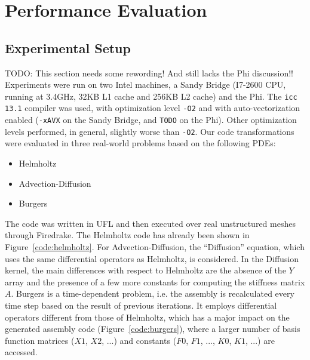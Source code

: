 \documentclass[conference]{IEEEtran}
\begin{document}
\section{Performance Evaluation}
\label{sec:perf-results}

\subsection{Experimental Setup}

TODO: This section needs some rewording! And still lacks the Phi discussion!! \\

Experiments were run on two Intel machines, a Sandy Bridge (I7-2600 CPU, running at 3.4GHz, 32KB L1 cache and 256KB L2 cache) and the Phi. The \texttt{icc 13.1} compiler was used, with optimization level \texttt{-O2} and with auto-vectorization enabled (\texttt{-xAVX} on the Sandy Bridge, and \texttt{TODO} on the Phi). Other optimization levels performed, in general, slightly worse than \texttt{-O2}. Our code transformations were evaluated in three real-world problems based on the following PDEs:
\begin{itemize}
\item Helmholtz
\item Advection-Diffusion
\item Burgers
\end{itemize}
The code was written in UFL and then executed over real unstructured meshes through Firedrake. The Helmholtz code has already been shown in Figure~\ref{code:helmholtz}. For Advection-Diffusion, the ``Diffusion'' equation, which uses the same differential operators as Helmholtz, is considered. In the Diffusion kernel, the main differences with respect to Helmholtz are the absence of the $Y$ array and the presence of a few more constants for computing the stiffness matrix $A$. Burgers is a time-dependent problem, i.e. the assembly is recalculated every time step based on the result of previous iterations. It employs differential operators different from those of Helmholtz, which has a major impact on the generated assembly code (Figure~\ref{code:burgers}), where a larger number of basis function matrices ($X1$, $X2$, ...) and constants ($F0$, $F1$, ..., $K0$, $K1$, ...) are accessed. 
\end{document}
